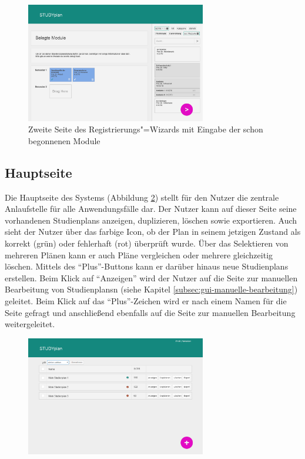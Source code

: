 \begin{figure}[!htb]
	\caption{Zweite Seite des Registrierungs"=\gls{Wizard}s mit Eingabe der schon begonnenen Module}
	\label{fig:gui-registrierung-2}
	\centering
	\includegraphics[width=0.7\textwidth]{../GUI/ergebnisse/registrierung-2.png}
\end{figure}


\subsection{Hauptseite}
\label{subsec:gui-hauptseite}
Die Hauptseite des Systems (Abbildung \ref{fig:gui-hauptseite-1}) stellt für den Nutzer die zentrale Anlaufstelle für alle Anwendungsfälle dar. Der Nutzer kann auf dieser Seite seine vorhandenen \glspl{Studienplan} anzeigen, duplizieren, löschen sowie exportieren. Auch sieht der Nutzer über das farbige Icon, ob der Plan in seinem jetzigen Zustand als korrekt (grün) oder fehlerhaft (rot) überprüft wurde. Über das Selektieren von mehreren Plänen kann er auch Pläne vergleichen oder mehrere gleichzeitig löschen. Mittels des \enquote{Plus}-Buttons kann er darüber hinaus neue \glspl{Studienplan} erstellen.\newline
Beim Klick auf \enquote{Anzeigen} wird der Nutzer auf die Seite zur manuellen Bearbeitung von \glspl{Studienplan}n (siehe Kapitel \ref{subsec:gui-manuelle-bearbeitung}) geleitet. Beim Klick auf das \enquote{Plus}-Zeichen wird er nach einem Namen für die Seite gefragt und anschließend ebenfalls auf die Seite zur manuellen Bearbeitung weitergeleitet.
\begin{figure}[!htb]
	\caption{}
	\label{fig:gui-hauptseite-1}
	\centering
	\includegraphics[width=0.7\textwidth]{../GUI/ergebnisse/hauptseite-1.png}
\end{figure}

